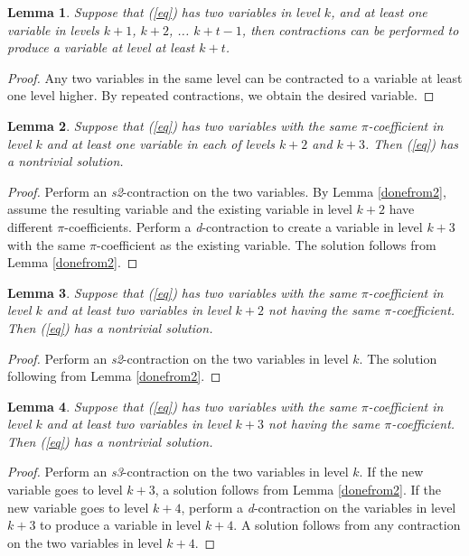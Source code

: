 \documentclass[draft]{publmathdeb}
\newtheorem{lemma}{Lemma}
\begin{document}
\begin{lemma} \label{slide}
Suppose that (\ref{eq}) has two variables in level $k$, and at least one variable in levels $k+1$, $k+2$, ... $k+t-1$, then contractions can be performed to produce a variable at level at least $k+t$.
\end{lemma}
\begin{proof}
Any two variables in the same level can be contracted to a variable at least one level higher.  By repeated contractions, we obtain the desired variable.
\end{proof}

\begin{lemma} \label{doneafters2}
Suppose that (\ref{eq}) has two variables with the same $\pi$-coefficient in level $k$ and at least one variable in each of levels $k+2$ and $k+3$.  Then (\ref{eq}) has a nontrivial solution.
\end{lemma}
\begin{proof}
Perform an \textit{s2}-contraction on the two variables.  By Lemma \ref{donefrom2}, assume the resulting variable and the existing variable in level $k+2$ have different $\pi$-coefficients.  Perform a \textit{d}-contraction to create a variable in level $k+3$ with the same $\pi$-coefficient as the existing variable.  The solution follows from Lemma \ref{donefrom2}.
\end{proof}

\begin{lemma} \label{doneafters2_2}
Suppose that (\ref{eq}) has two variables with the same $\pi$-coefficient in level $k$ and at least two variables in level $k+2$ not having the same $\pi$-coefficient.  Then (\ref{eq}) has a nontrivial solution.
\end{lemma}
\begin{proof}
Perform an \textit{s2}-contraction on the two variables in level $k$.  The solution following from Lemma \ref{donefrom2}.
\end{proof}

\begin{lemma} \label{doneafters3_2}
Suppose that (\ref{eq}) has two variables with the same $\pi$-coefficient in level $k$ and at least two variables in level $k+3$ not having the same $\pi$-coefficient.  Then (\ref{eq}) has a nontrivial solution.
\end{lemma}
\begin{proof}
Perform an \textit{s3}-contraction on the two variables in level $k$.  If the new variable goes to level $k+3$, a solution follows from Lemma \ref{donefrom2}.  If the new variable goes to level $k+4$, perform a \textit{d}-contraction on the variables in level $k+3$ to produce a variable in level $k+4$.  A solution follows from any contraction on the two variables in level $k+4$.
\end{proof}
\end{document}
